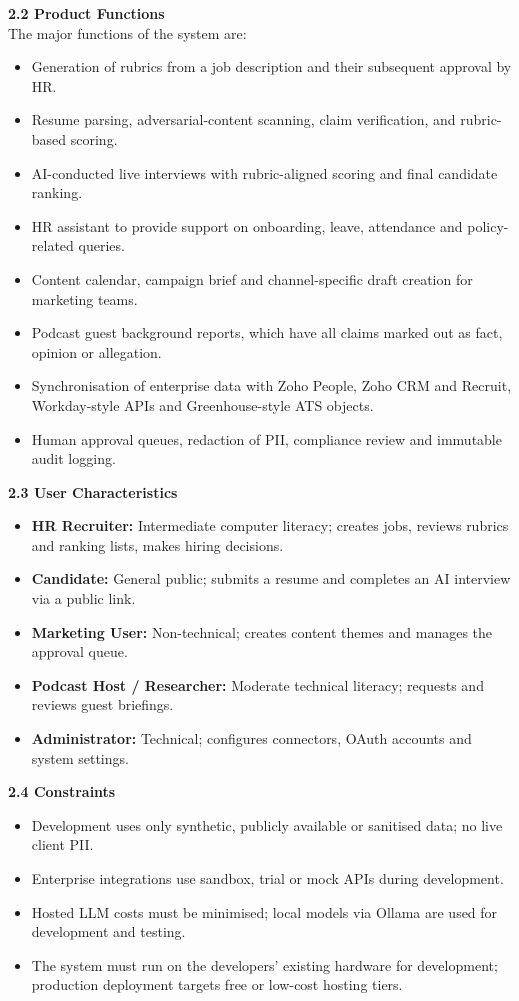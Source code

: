 \vspace{8pt}
\noindent\textbf{2.2 Product Functions}\\
The major functions of the system are:
\begin{itemize}
\item Generation of rubrics from a job description and their subsequent approval by HR.
\item Resume parsing, adversarial-content scanning, claim verification, and rubric-based scoring.
\item AI-conducted live interviews with rubric-aligned scoring and final candidate ranking.
\item HR assistant to provide support on onboarding, leave, attendance and policy-related queries.
\item Content calendar, campaign brief and channel-specific draft creation for marketing teams.
\item Podcast guest background reports, which have all claims marked out as fact, opinion or allegation.
\item Synchronisation of enterprise data with Zoho People, Zoho CRM and Recruit, Workday-style APIs and Greenhouse-style ATS objects.
\item Human approval queues, redaction of PII, compliance review and immutable audit logging.
\end{itemize}

\vspace{8pt}
\noindent\textbf{2.3 User Characteristics}\\
\begin{itemize}
  \item \textbf{HR Recruiter:} Intermediate computer literacy; creates jobs, reviews rubrics and ranking lists, makes hiring decisions.
  \item \textbf{Candidate:} General public; submits a resume and completes an AI interview via a public link.
  \item \textbf{Marketing User:} Non-technical; creates content themes and manages the approval queue.
  \item \textbf{Podcast Host / Researcher:} Moderate technical literacy; requests and reviews guest briefings.
  \item \textbf{Administrator:} Technical; configures connectors, OAuth accounts and system settings.
\end{itemize}

\vspace{8pt}
\noindent\textbf{2.4 Constraints}
\begin{itemize}
  \item Development uses only synthetic, publicly available or sanitised data; no live client PII.
  \item Enterprise integrations use sandbox, trial or mock APIs during development.
  \item Hosted LLM costs must be minimised; local models via Ollama are used for development and testing.
  \item The system must run on the developers' existing hardware for development; production deployment targets free or low-cost hosting tiers.
\end{itemize}

